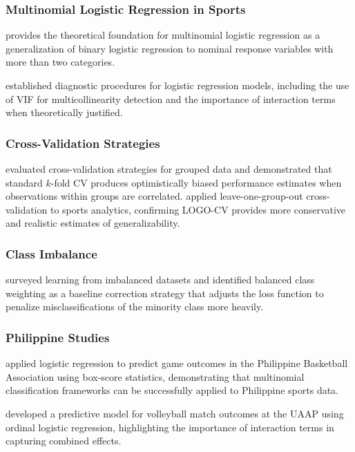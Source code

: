 \subsubsection{Multinomial Logistic Regression in Sports}

\textcite{agresti2013} provides the theoretical foundation for multinomial
logistic regression as a generalization of binary logistic regression to
nominal response variables with more than two categories.

\textcite{hosmer2013} established diagnostic procedures for logistic
regression models, including the use of VIF for multicollinearity detection
and the importance of interaction terms when theoretically justified.

\subsubsection{Cross-Validation Strategies}

\textcite{varoquaux2019} evaluated cross-validation strategies for grouped
data and demonstrated that standard $k$-fold CV produces optimistically biased
performance estimates when observations within groups are correlated.
\textcite{wong2023} applied leave-one-group-out cross-validation to sports
analytics, confirming LOGO-CV provides more conservative and realistic
estimates of generalizability.

\subsubsection{Class Imbalance}

\textcite{he2009learning} surveyed learning from imbalanced datasets and
identified balanced class weighting as a baseline correction strategy that
adjusts the loss function to penalize misclassifications of the minority class
more heavily.

\subsubsection{Philippine Studies}

\textcite{dalisay2022} applied logistic regression to predict game outcomes
in the Philippine Basketball Association using box-score statistics,
demonstrating that multinomial classification frameworks can be successfully
applied to Philippine sports data.

\textcite{reyes2021} developed a predictive model for volleyball match
outcomes at the UAAP using ordinal logistic regression, highlighting the
importance of interaction terms in capturing combined effects.

